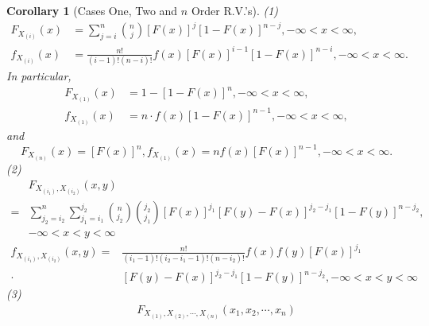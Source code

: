 \documentclass[openany,12pt]{book}
\newtheorem{corollary}{Corollary}[chapter]
\begin{document}
\begin{corollary}[Cases One, Two and $n$ Order R.V.'s]

  (1)
  \[\begin{aligned}
      F_{X_{\left( i \right)}}(x) & = \sum_{j = i}^{n}{\binom{n}{j}\left[ F(x) \right]^{j}\left[ 1 - F(x) \right]^{n - j}}, -\infty < x < \infty,                                \\
      f_{X_{\left( i \right)}}(x) & = \frac{n!}{\left( i - 1 \right)!\left( n - i \right)!}f(x)\left[ F(x) \right]^{i - 1}\left[ 1 - F(x) \right]^{n - i}, -\infty < x < \infty.
    \end{aligned}\]
  In particular,
  \[\begin{aligned}
      F_{X_{\left( 1 \right)}}(x) & = 1 - \left[ 1 - F(x) \right]^{n}, -\infty < x < \infty,            \\
      f_{X_{\left( 1 \right)}}(x) & = n\cdot f(x)\left[ 1 - F(x) \right]^{n - 1}, -\infty < x < \infty,
    \end{aligned}\]
  and
  \[F_{X_{\left( n \right)}}(x)= \left[ F(x) \right]^{n}, f_{X_{\left( 1 \right)}}(x)= nf(x)\left[ F(x) \right]^{n - 1}, -\infty < x < \infty.\]
  (2)
  \[\begin{aligned}
        & F_{X_{\left( i_{1} \right)},X_{\left( i_{2} \right)}}(x,y)                                                                                                                                               \\
      = & \sum_{j_{2} = i_{2}}^{n}{\sum_{j_{1} = i_{1}}^{j_{2}}{\binom{n}{j_{2}}  \binom{j_{2}}{j_{1}} \left[ F(x) \right]^{j_{1}}\left[ F(y) - F(x) \right]^{j_{2} - j_{1}}\left[ 1 - F(y) \right]^{n - j_{2}}}}, \\
        & - \infty < x < y < \infty
    \end{aligned}\]
  \[\begin{aligned}
      f_{X_{\left( i_{1} \right)},X_{\left( i_{2} \right)}}(x,y)= & \frac{n!}{\left( i_{1} - 1 \right)!\left( i_{2} - i_{1} - 1 \right)!\left( n - i_{2} \right)!}f(x)f(y)\left[ F(x) \right]^{j_{1}}
      \\
      \cdot                                                        & \left[ F(y) - F(x) \right]^{j_{2} - j_{1}}\left[ 1 - F(y) \right]^{n - j_{2}}, - \infty < x < y < \infty
    \end{aligned}\]
  (3)
  \[\begin{aligned}
       & \quad F_{X_{(1)},X_{(2)}, \cdots,X_{(n)}}\left( x_{1},x_{2}, \cdots, x_{n} \right)                                                                                                                                            \\

\end{aligned}\]
\end{corollary}
\end{document}
